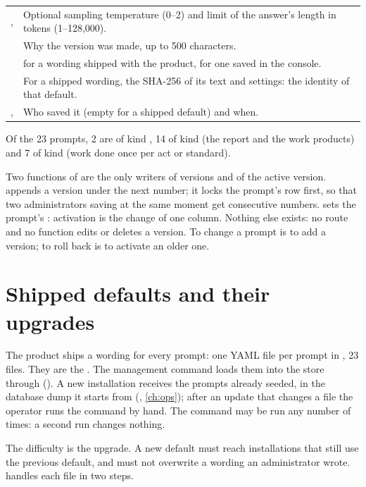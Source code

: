 \begin{table}[H]
\begin{tabularx}{\textwidth}{@{}L{34mm}Y@{}}
,  & Optional sampling temperature (0–2) and limit of the answer's length in tokens (1–128,000). \\
 & Why the version was made, up to 500 characters. \\
 &  for a wording shipped with the product,  for one saved in the console. \\
 & For a shipped wording, the SHA-256 of its text and settings: the identity of that default. \\
,  & Who saved it (empty for a shipped default) and when. \\
\bottomrule
\end{tabularx}
\end{table}

Of the 23 prompts, 2 are of kind , 14 of kind  (the report and the
work products) and 7 of kind  (work done once per act or standard).

Two functions of  are the only writers of versions and of the active version.  appends a
version under the next number; it locks the prompt's row first, so that two administrators
saving at the same moment get consecutive numbers.  sets the prompt's
: activation is the change of one column. Nothing else exists: no route
and no function edits or deletes a version. To change a prompt is to add a version; to roll
back is to activate an older one.


\section{Shipped defaults and their upgrades}\label{sec:prompts:defaults}

The product ships a wording for every prompt: one YAML file per prompt in
, 23 files. They are the . The management command
 loads them into the store through 
(). A new installation receives the prompts already seeded, in the
database dump it starts from (, \cref{ch:ops}); after an update that changes a file the operator
runs the command by hand. The command may be run any number of times: a second run changes nothing.

The difficulty is the upgrade. A new default must reach installations that still use the
previous default, and must not overwrite a wording an administrator wrote. 
handles each file in two steps.

